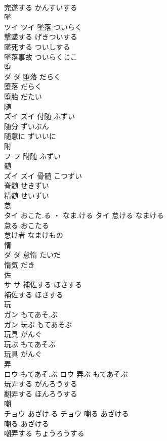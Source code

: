 \documentclass[8pt]{extreport}
\begin{document}
\begin{CJK}{UTF8}{min}
\\	完遂する	かんすいする	
\\	墜	
\\	ツイ		ツイ	墜落	ついらく	
\\	撃墜する	げきついする	
\\	墜死する	ついしする	
\\	墜落事故	ついらくじこ	
\\	堕	
\\	ダ		ダ	堕落	だらく	
\\	堕落	だらく	
\\	堕胎	だたい	
\\	随	
\\	ズイ		ズイ	付随	ふずい	
\\	随分	ずいぶん	
\\	随意に	ずいいに	
\\	附	
\\	フ		フ													附随	ふずい	
\\	髄	
\\	ズイ		ズイ	骨髄	こつずい	
\\	脊髄	せきずい	
\\	精髄	せいずい	
\\	怠	
\\	タイ	おこた.る ・ なま.ける	タイ	怠ける	なまける	
\\	怠る	おこたる	
\\	怠け者	なまけもの	
\\	惰	
\\	ダ		ダ	怠惰	たいだ	
\\	惰気	だき	
\\	佐	
\\	サ		サ	補佐する	ほさする	
\\	補佐する	ほさする	
\\	玩	
\\	ガン	もてあそ.ぶ
\\	ガン	玩ぶ	もてあそぶ	
\\	玩具	がんぐ	
\\	玩ぶ	もてあそぶ	
\\	玩具	がんぐ	
\\	弄	
\\	ロウ	もてあそ.ぶ	ロウ	弄ぶ	もてあそぶ	
\\	玩弄する	がんろうする	
\\	翻弄する	ほんろうする	
\\	嘲	
\\	チョウ	あざけ.る	チョウ	嘲る	あざける	
\\	嘲る	あざける	
\\	嘲弄する	ちょうろうする	

\end{CJK}
\end{document}
